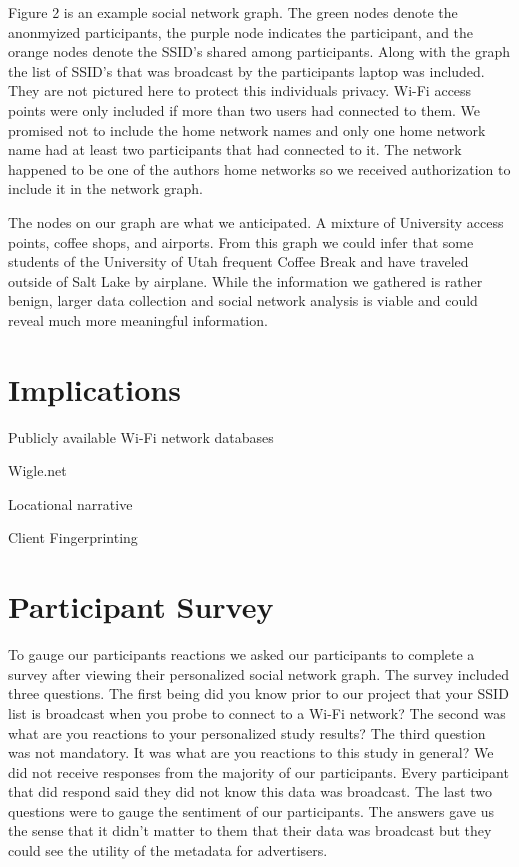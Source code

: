\documentclass[letterpaper,twocolumn,10pt]{article}
\begin{document}
Figure 2 is an example social network graph. The green nodes denote the anonmyized participants, the purple node indicates the participant, and the orange nodes denote the SSID's shared among participants. Along with the graph the list of SSID's that was broadcast by the participants laptop was included. They are not pictured here to protect this individuals privacy. Wi-Fi access points were only included if more than two users had connected to them. We promised not to include the home network names and only one home network name had at least two participants that had connected to it. The network happened to be one of the authors home networks so we received authorization to include it in the network graph. 

The nodes on our graph are what we anticipated. A mixture of University access points, coffee shops, and airports. From this graph we could infer that some students of the University of Utah frequent Coffee Break and have traveled outside of Salt Lake by airplane. While the information we gathered is rather benign, larger data collection and social network analysis is viable and could reveal much more meaningful information. 

\section{Implications}
Publicly available Wi-Fi network databases 

Wigle.net

Locational narrative 

Client Fingerprinting


\section{Participant Survey}


To gauge our participants reactions we asked our participants to complete a survey after viewing their personalized social network graph. The survey included three questions. The first being did you know prior to our project that your SSID list is broadcast when you probe to connect to a Wi-Fi network? The second was what are you reactions to your personalized study results? The third question was not mandatory. It was what are you reactions to this study in general? We did not receive responses from the majority of our participants. Every participant that did respond said they did not know this data was broadcast. The last two questions were to gauge the sentiment of our participants. The answers gave us the sense that it didn't matter to them that their data was broadcast but they could see the utility of the metadata for advertisers.
\end{document}
